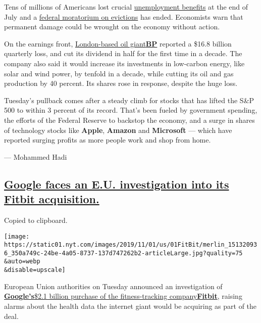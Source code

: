Tens of millions of Americans lost crucial
\href{https://www.nytimes.com/2020/07/30/business/unemployment-payments-change.html}{unemployment
benefits} at the end of July and a
\href{https://www.nytimes.com/2020/07/23/business/evictions-moratorium-cares-act.html}{federal
moratorium on evictions} has ended. Economists warn that permanent
damage could be wrought on the economy without action.

On the earnings front,
\href{https://www.nytimes.com/live/2020/08/04/business/stock-market-today-coronavirus/bp-to-step-up-renewable-investment-as-it-reports-a-huge-loss}{London-based
oil
giant}\textbf{\href{https://www.nytimes.com/live/2020/08/04/business/stock-market-today-coronavirus/bp-to-step-up-renewable-investment-as-it-reports-a-huge-loss}{BP}}
reported a \$16.8 billion quarterly loss, and cut its dividend in half
for the first time in a decade. The company also said it would increase
its investments in low-carbon energy, like solar and wind power, by
tenfold in a decade, while cutting its oil and gas production by 40
percent. Its shares rose in response, despite the huge loss.

Tuesday's pullback comes after a steady climb for stocks that has lifted
the S\&P 500 to within 3 percent of its record. That's been fueled by
government spending, the efforts of the Federal Reserve to backstop the
economy, and a surge in shares of technology stocks like \textbf{Apple},
\textbf{Amazon} and \textbf{Microsoft} --- which have reported surging
profits as more people work and shop from home.

--- Mohammed Hadi

\hypertarget{google-faces-an-eu-investigation-into-its-fitbit-acquisition}{%
\subsection{\texorpdfstring{\protect\hyperlink{google-faces-an-eu-investigation-into-its-fitbit-acquisition}{Google
faces an E.U. investigation into its Fitbit
acquisition.}}{Google faces an E.U. investigation into its Fitbit acquisition.}}\label{google-faces-an-eu-investigation-into-its-fitbit-acquisition}}

Copied to clipboard.

\texttt{[image: https://static01.nyt.com/images/2019/11/01/us/01FitBit/merlin\_151320936\_350a749c-24be-4a05-8737-137d747262b2-articleLarge.jpg?quality=75\\\&auto=webp\\\&disable=upscale]}

European Union authorities on Tuesday announced an investigation of
\textbf{\href{https://www.nytimes.com/2019/11/01/technology/google-fitbit.html}{Google's}}\href{https://www.nytimes.com/2019/11/01/technology/google-fitbit.html}{\$2.1
billion purchase of the fitness-tracking
company}\textbf{\href{https://www.nytimes.com/2019/11/01/technology/google-fitbit.html}{Fitbit}},
raising alarms about the health data the internet giant would be
acquiring as part of the deal.

